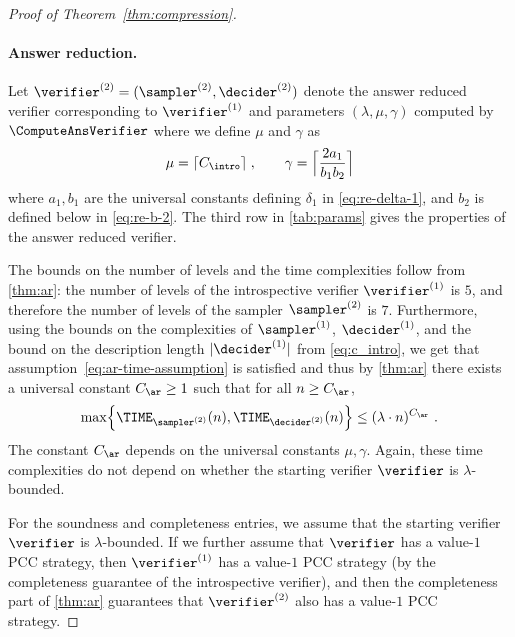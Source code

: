 \begin{proof}[Proof of Theorem~\ref{thm:compression}]
  










  \paragraph{Answer reduction.} 
  Let $\verifier^{(2)} = (\sampler^{(2)}, \decider^{(2)})$ denote the answer
  reduced verifier corresponding to $\verifier^{(1)}$ and parameters $(\lambda,
\mu, \gamma)$ computed by $\ComputeAnsVerifier$ where we define $\mu$ and $\gamma$ as
  \begin{equation}
  \label{eq:mu-gamma}
  	\mu = \lceil C_\intro \rceil \;, \qquad \gamma = \Bigl\lceil \frac{2 a_1}{b_1 b_2} \Bigr\rceil
\end{equation}
where $a_1,b_1$ are the universal constants defining $\delta_1$ in \cref{eq:re-delta-1}, and $b_2$ is defined below in \cref{eq:re-b-2}. 
The third row in \cref{tab:params} gives the properties of
  the answer reduced verifier.


  The bounds on the number of levels and the time complexities follow
  from \cref{thm:ar}: the number of levels of the introspective verifier $\verifier^{(1)}$ is $5$, and therefore the number of levels of the sampler $\sampler^{(2)}$ is $7$. Furthermore, using the bounds on the complexities of $\sampler^{(1)}$, $\decider^{(1)}$, and the bound on the description length $|\decider^{(1)}|$ from \cref{eq:c_intro}, we get that assumption~\eqref{eq:ar-time-assumption} is satisfied and thus by \cref{thm:ar}
  there exists a universal
  constant $C_{\ar} \geq 1$ such that for all $n \geq C_{\ar}$,
\begin{equation}
    \label{eq:c_ar}
      \max \Bigl\{  \TIME_{\sampler^{(2)}}(n),  \TIME_{\decider^{(2)}}(n)
      \Bigr\} \le (\lambda \cdot n)^{C_\ar}~.
  \end{equation}
  The constant $C_\ar$ depends on the universal constants $\mu,\gamma$. Again, these time complexities do not depend on whether the starting verifier $\verifier$ is $\lambda$-bounded.

  For the soundness and completeness entries, we assume that the starting verifier $\verifier$ is $\lambda$-bounded. If we further assume that $\verifier$ has a value-$1$ PCC strategy, then $\verifier^{(1)}$ has a value-$1$ PCC strategy (by the completeness guarantee of the introspective verifier), and then the completeness part of \cref{thm:ar} guarantees that $\verifier^{(2)}$ also has a value-$1$ PCC strategy.
  

\end{proof}
